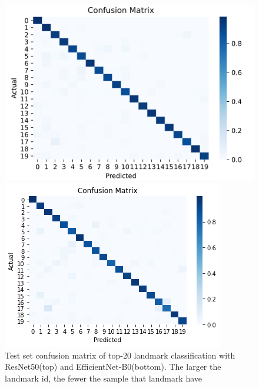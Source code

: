 \documentclass[10pt,twocolumn,letterpaper]{article}
\begin{document}
\begin{figure}
    \centering
    \begin{minipage}[t]{0.4\textwidth}
        \includegraphics[width=\textwidth]{COMP4471_Final_Report/img/top20_test_resnet.png}
    \end{minipage}
    \begin{minipage}[t]{0.4\textwidth}
        \includegraphics[width=\textwidth]{COMP4471_Final_Report/img/top20_test_efficientnet.png}
    \end{minipage}
    \caption{Test set confusion matrix of top-20 landmark classification with ResNet50(top) and EfficientNet-B0(bottom). The larger the landmark id, the fewer the sample that landmark have}
    \label{fig:cm_top20}
\end{figure}
\end{document}
